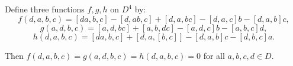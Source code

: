 Define three functions $f, g, h$ on $D^4$ by:
$$f(d, a, b, c) = [da, b, c] - [d, ab, c] + [d, a, bc] - [d, a, c]b - [d, a, b]c,$$
$$g(a, d, b, c) = [a, d, bc] + [a, b, dc] - [a, d, c]b - [a, b, c]d,$$
$$h(d, a, b, c) = [da, b, c] + [d, a, [b, c]] - [d, a, b]c - [d, b, c]a.$$

Then $f(d, a, b, c) = g(a, d, b, c) = h(d, a, b, c) = 0$ for all $a, b, c, d \in D$.
